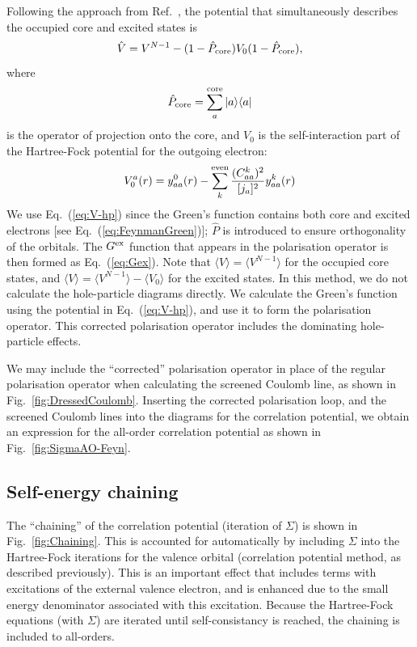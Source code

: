 \documentclass[10pt,twocolumn,a4paper]{article}%
\newcommand{\bra}[1]{\ensuremath{\langle #1|}}	%
\newcommand{\ket}[1]{\ensuremath{|#1\rangle}}
\newcommand{\braket}[1]{\ensuremath{\langle #1\rangle}}	%
\newcommand{\be}{\begin{equation}}
\newcommand{\ee}{\end{equation}}
\begin{document}
Following the approach from Ref.~\cite{DzubaCPM1989plaEn}, the potential that simultaneously describes the occupied core and excited states is
\be\label{eq:V-hp}
\hat V = V^{N-1} - (1-\hat P_{\rm core})V_0 (1-\hat P_{\rm core}),
\ee
where
\be
\hat P_{\rm core} = \sum_a^{\rm core}\ket{a}\bra{a}
\ee
is the operator of projection onto the core, and $V_0$ is the self-interaction part of the Hartree-Fock potential for the outgoing electron:
 \be
V_0^a(r) = y^0_{aa}(r) - \sum_k^{\rm even}\frac{(C^k_{aa})^2}{[j_a]^2}y^k_{aa}(r)
\ee
%
We use Eq.~(\ref{eq:V-hp}) since the Green's function contains both core and excited electrons [see Eq.~(\ref{eq:FeynmanGreen})]; $\hat P$ is introduced to ensure orthogonality of the orbitals.
The $G^{\rm ex}$ function that appears in the polarisation operator is then formed as Eq.~(\ref{eq:Gex}).
Note that $\braket{V}=\braket{V^{N-1}}$ for the occupied core states, and
$\braket{V}=\braket{V^{N-1}}-\braket{V_0}$ for the excited states.
In this method, we do not calculate the hole-particle diagrams directly.
We calculate the Green's function using the potential in Eq.~(\ref{eq:V-hp}), and use it to form the polarisation operator.
This corrected polarisation operator includes the dominating hole-particle effects.



We may include the ``corrected'' polarisation operator in place of the regular polarisation operator when calculating the screened Coulomb line, as shown in Fig.~\ref{fig:DressedCoulomb}.
Inserting the corrected polarisation loop, and the screened Coulomb lines into the diagrams for the correlation potential, we obtain an expression for the all-order correlation potential as shown in Fig.~\ref{fig:SigmaAO-Feyn}.







\subsection{Self-energy chaining}

The ``chaining'' of the correlation potential (iteration of $\Sigma$) is shown in Fig.~\ref{fig:Chaining}.
This is accounted for automatically by including $\Sigma$ into the Hartree-Fock iterations for the valence orbital (correlation potential method, as described previously).
This is an important effect that includes terms with excitations of the external valence electron, and is enhanced due to the small energy denominator associated with this excitation.
Because the Hartree-Fock equations (with $\Sigma$) are iterated until self-consistancy is reached, the chaining is included to all-orders.
\end{document}

